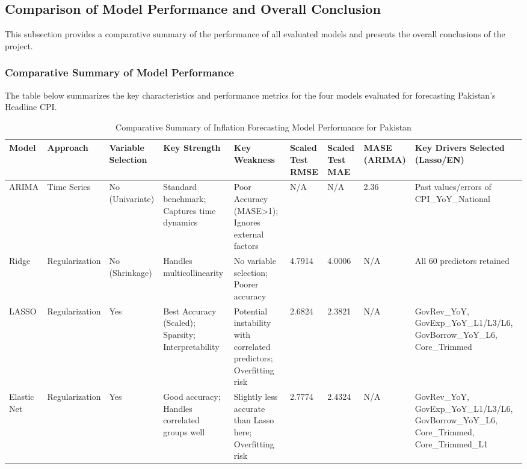 \documentclass[12pt,a4paper]{article}
\begin{document}
\subsection{Comparison of Model Performance and Overall Conclusion}

This subsection provides a comparative summary of the performance of all evaluated models and presents the overall conclusions of the project.

\subsubsection{Comparative Summary of Model Performance}

The table below summarizes the key characteristics and performance metrics for the four models evaluated for forecasting Pakistan's Headline CPI.

\begin{table}[h!]
\centering
\caption{Comparative Summary of Inflation Forecasting Model Performance for Pakistan}
\label{tab:model_comparison}
\footnotesize %
\begin{tabular}{|p{1.8cm}|p{2.3cm}|p{1.8cm}|p{2.5cm}|p{2.5cm}|p{1.8cm}|p{1.8cm}|p{1.8cm}|p{3.5cm}|}
\hline
\textbf{Model} & \textbf{Approach} & \textbf{Variable Selection} & \textbf{Key Strength} & \textbf{Key Weakness} & \textbf{Scaled Test RMSE} & \textbf{Scaled Test MAE} & \textbf{MASE (ARIMA)} & \textbf{Key Drivers Selected (Lasso/EN)} \\
\hline
ARIMA & Time Series & No (Univariate) & Standard benchmark; Captures time dynamics & Poor Accuracy (MASE>1); Ignores external factors & N/A & N/A & 2.36 & Past values/errors of CPI\_YoY\_National \\
\hline
Ridge & Regularization & No (Shrinkage) & Handles multicollinearity & No variable selection; Poorer accuracy & 4.7914 & 4.0006 & N/A & All 60 predictors retained \\
\hline
LASSO & Regularization & Yes & Best Accuracy (Scaled); Sparsity; Interpretability & Potential instability with correlated predictors; Overfitting risk & 2.6824 & 2.3821 & N/A & GovRev\_YoY, GovExp\_YoY\_L1/L3/L6, GovBorrow\_YoY\_L6, Core\_Trimmed \\
\hline
Elastic Net & Regularization & Yes & Good accuracy; Handles correlated groups well & Slightly less accurate than Lasso here; Overfitting risk & 2.7774 & 2.4324 & N/A & GovRev\_YoY, GovExp\_YoY\_L1/L3/L6, GovBorrow\_YoY\_L6, Core\_Trimmed, Core\_Trimmed\_L1 \\
\hline
\end{tabular}
\end{table}
\end{document}
